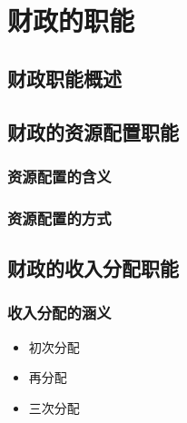\documentclass[
]{book}
\providecommand{\tightlist}{%
  \setlength{\itemsep}{0pt}\setlength{\parskip}{0pt}}
\theoremstyle{definition}
\theoremstyle{definition}
\theoremstyle{definition}
\theoremstyle{definition}
\theoremstyle{remark}
\begin{document}
\hypertarget{ux804cux80fd}{%
\chapter{财政的职能}\label{ux804cux80fd}}

\hypertarget{ux8d22ux653fux804cux80fdux6982ux8ff0}{%
\section{财政职能概述}\label{ux8d22ux653fux804cux80fdux6982ux8ff0}}

\hypertarget{ux8d22ux653fux7684ux8d44ux6e90ux914dux7f6eux804cux80fd}{%
\section{财政的资源配置职能}\label{ux8d22ux653fux7684ux8d44ux6e90ux914dux7f6eux804cux80fd}}

\hypertarget{ux8d44ux6e90ux914dux7f6eux7684ux542bux4e49}{%
\subsection{资源配置的含义}\label{ux8d44ux6e90ux914dux7f6eux7684ux542bux4e49}}

\hypertarget{ux8d44ux6e90ux914dux7f6eux7684ux65b9ux5f0f}{%
\subsection{资源配置的方式}\label{ux8d44ux6e90ux914dux7f6eux7684ux65b9ux5f0f}}

\hypertarget{ux8d22ux653fux7684ux6536ux5165ux5206ux914dux804cux80fd}{%
\section{财政的收入分配职能}\label{ux8d22ux653fux7684ux6536ux5165ux5206ux914dux804cux80fd}}

\hypertarget{ux6536ux5165ux5206ux914dux7684ux6db5ux4e49}{%
\subsection{收入分配的涵义}\label{ux6536ux5165ux5206ux914dux7684ux6db5ux4e49}}

\begin{itemize}
\tightlist
\item
  初次分配
\item
  再分配
\item
  三次分配
\end{itemize}
\end{document}
